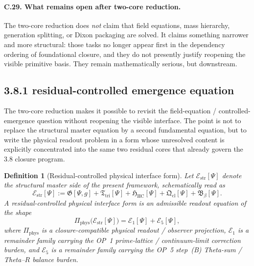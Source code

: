 \documentclass[12pt,a4paper]{article}
\newtheorem{definition}[theorem]{Definition}
\begin{document}
\paragraph{C.29. What remains open after two-core reduction.}
The two-core reduction does \emph{not} claim that field equations, mass hierarchy, generation splitting, or Dixon packaging are solved. It claims something narrower and more structural: those tasks no longer appear first in the dependency ordering of foundational closure, and they do not presently justify reopening the visible primitive basis. They remain mathematically serious, but downstream.

\subsection*{3.8.1 residual-controlled emergence equation}
The two-core reduction makes it possible to revisit the field-equation / controlled-emergence question without reopening the visible interface. The point is not to replace the structural master equation by a second fundamental equation, but to write the physical readout problem in a form whose unresolved content is explicitly concentrated into the same two residual cores that already govern the 3.8 closure program.

\begin{definition}[Residual-controlled physical interface form]
\label{def:mainline-3810}
Let \(\mathcal E_{\mathrm{str}}[\Psi]\) denote the structural master side of the present framework, schematically read as
\[
 \mathcal E_{\mathrm{str}}[\Psi]
 :=
 \mathfrak G[\Psi,g]
 + \mathfrak T_{\mathrm{tri}}[\Psi]
 + \mathfrak H_{\mathrm{HC}}[\Psi]
 + \mathfrak Q_{\mathrm{cl}}[\Psi]
 + \mathfrak B_{\beta}[\Psi].
\]
A \emph{residual-controlled physical interface form} is an admissible readout equation of the shape
\[
 \Pi_{\mathrm{phys}}\bigl(\mathcal E_{\mathrm{str}}[\Psi]\bigr)
 =
 \mathcal E_{1}[\Psi]
 +
 \mathcal E_{5}[\Psi],
\]
where \(\Pi_{\mathrm{phys}}\) is a closure-compatible physical readout / observer projection, \(\mathcal E_{1}\) is a remainder family carrying the OP~1 prime-lattice / continuum-limit correction burden, and \(\mathcal E_{5}\) is a remainder family carrying the OP~5 step~(B) Theta-sum / Theta--\(R\) balance burden.
\end{definition}
\end{document}
